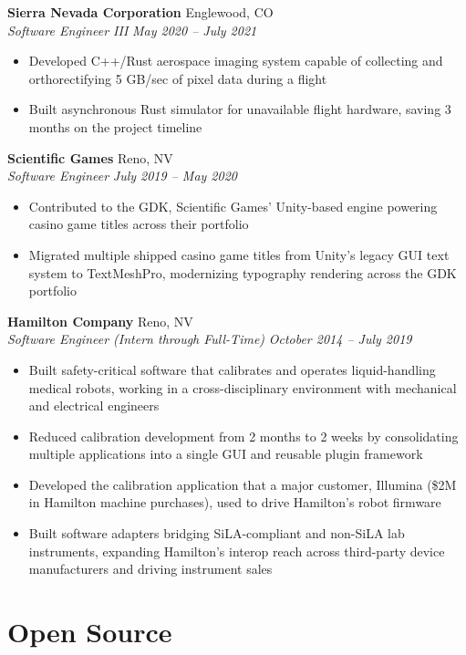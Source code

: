 \documentclass[11pt,letterpaper]{article}
\newcommand{\jobentry}[4]{%
  \needspace{5\baselineskip}%
  \vspace{4pt}%
  \textbf{#1} \hfill #2 \\
  \textit{#3} \hfill \textit{#4}%
  \vspace{-4pt}%
  \nopagebreak[4]%
}
\begin{document}
\jobentry{Sierra Nevada Corporation}{Englewood, CO}{Software Engineer III}{May 2020 -- July 2021}
\begin{itemize}
  \item Developed C++/Rust aerospace imaging system capable of collecting and orthorectifying 5 GB/sec of pixel data during a flight
  \item Built asynchronous Rust simulator for unavailable flight hardware, saving 3 months on the project timeline
\end{itemize}

\jobentry{Scientific Games}{Reno, NV}{Software Engineer}{July 2019 -- May 2020}
\begin{itemize}
  \item Contributed to the GDK, Scientific Games' Unity-based engine powering casino game titles across their portfolio
  \item Migrated multiple shipped casino game titles from Unity's legacy GUI text system to TextMeshPro, modernizing typography rendering across the GDK portfolio
\end{itemize}

\jobentry{Hamilton Company}{Reno, NV}{Software Engineer (Intern through Full-Time)}{October 2014 -- July 2019}
\begin{itemize}
  \item Built safety-critical software that calibrates and operates liquid-handling medical robots, working in a cross-disciplinary environment with mechanical and electrical engineers
  \item Reduced calibration development from 2 months to 2 weeks by consolidating multiple applications into a single GUI and reusable plugin framework
  \item Developed the calibration application that a major customer, Illumina (\$2M in Hamilton machine purchases), used to drive Hamilton's robot firmware
  \item Built software adapters bridging SiLA-compliant and non-SiLA lab instruments, expanding Hamilton's interop reach across third-party device manufacturers and driving instrument sales
\end{itemize}

\section*{Open Source}
\end{document}
